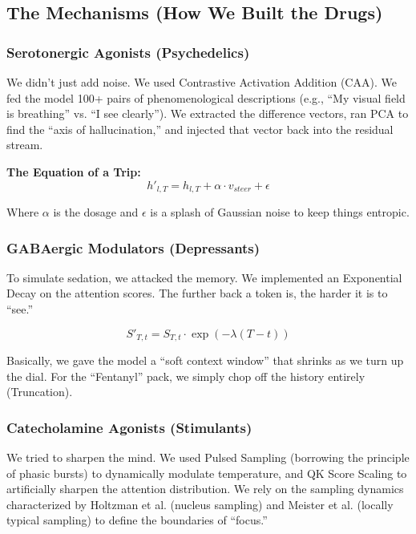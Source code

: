 \documentclass[10pt, twocolumn]{article}
\begin{document}
\subsection{The Mechanisms (How We Built the Drugs)}

\subsubsection{Serotonergic Agonists (Psychedelics)}
We didn't just add noise. We used Contrastive Activation Addition (CAA). We fed the model 100+ pairs of phenomenological descriptions (e.g., ``My visual field is breathing'' vs. ``I see clearly''). We extracted the difference vectors, ran PCA to find the ``axis of hallucination,'' and injected that vector back into the residual stream.

\textbf{The Equation of a Trip:}
\begin{equation}
    h'_{l,T} = h_{l,T} + \alpha \cdot v_{steer} + \epsilon
\end{equation}

Where $\alpha$ is the dosage and $\epsilon$ is a splash of Gaussian noise to keep things entropic.

\subsubsection{GABAergic Modulators (Depressants)}
To simulate sedation, we attacked the memory. We implemented an Exponential Decay on the attention scores. The further back a token is, the harder it is to ``see.''

\begin{equation}
    S'_{T,t} = S_{T,t} \cdot \exp(-\lambda (T - t))
\end{equation}

Basically, we gave the model a ``soft context window'' that shrinks as we turn up the dial. For the ``Fentanyl'' pack, we simply chop off the history entirely (Truncation).

\subsubsection{Catecholamine Agonists (Stimulants)}
We tried to sharpen the mind. We used Pulsed Sampling (borrowing the principle of phasic bursts) to dynamically modulate temperature, and QK Score Scaling to artificially sharpen the attention distribution. We rely on the sampling dynamics characterized by Holtzman et al. \cite{holtzman2020} (nucleus sampling) and Meister et al. \cite{meister2023} (locally typical sampling) to define the boundaries of ``focus.''
\end{document}

